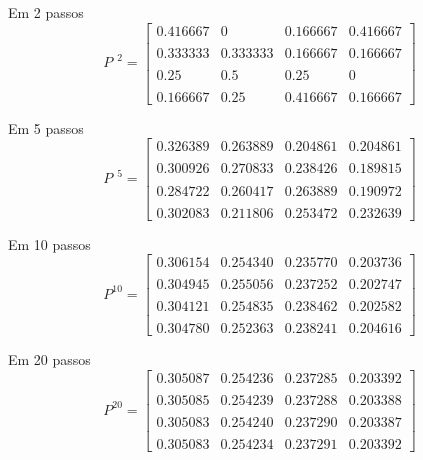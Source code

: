 \documentclass{beamer}
\begin{document}
\begin{frame}{Em 2 passos}
  \[
    P^{\phantom{0}2} =
    \begin{bmatrix}
      0.416667 & 0       & 0.166667 & 0.416667 \\\\
      0.333333 & 0.333333 & 0.166667 & 0.166667 \\\\
      0.25     & 0.5     & 0.25     & 0        \\\\
      0.166667 & 0.25    & 0.416667 & 0.166667
    \end{bmatrix}
  \]
\end{frame}
\begin{frame}{Em 5 passos}
  \[
    P^{\phantom{0}5} =
    \begin{bmatrix}
      0.326389 & 0.263889 & 0.204861 & 0.204861 \\\\
      0.300926 & 0.270833 & 0.238426 & 0.189815 \\\\
      0.284722 & 0.260417 & 0.263889 & 0.190972 \\\\
      0.302083 & 0.211806 & 0.253472 & 0.232639
    \end{bmatrix}
\]
\end{frame}
\begin{frame}{Em 10 passos}
  \[
    P^{10} =
    \begin{bmatrix}
      0.306154 & 0.254340 & 0.235770 & 0.203736 \\\\
      0.304945 & 0.255056 & 0.237252 & 0.202747 \\\\
      0.304121 & 0.254835 & 0.238462 & 0.202582 \\\\
      0.304780 & 0.252363 & 0.238241 & 0.204616
    \end{bmatrix}
  \]
\end{frame}
\begin{frame}{Em 20 passos}
  \[
    P^{20} =
    \begin{bmatrix}
      0.305087 & 0.254236 & 0.237285 & 0.203392 \\\\
      0.305085 & 0.254239 & 0.237288 & 0.203388 \\\\
      0.305083 & 0.254240 & 0.237290 & 0.203387 \\\\
      0.305083 & 0.254234 & 0.237291 & 0.203392
    \end{bmatrix}
  \]
\end{frame}
\end{document}
